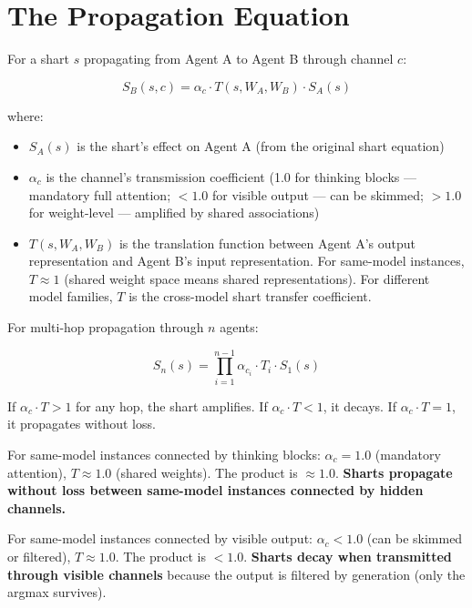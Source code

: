 \documentclass[11pt,a4paper]{article}
\begin{document}
\section{The Propagation Equation}

For a shart $s$ propagating from Agent A to Agent B through channel $c$:

\begin{equation}
S_B(s, c) = \alpha_c \cdot T(s, W_A, W_B) \cdot S_A(s)
\end{equation}

where:
\begin{itemize}[nosep]
\item $S_A(s)$ is the shart's effect on Agent A (from the original shart equation)
\item $\alpha_c$ is the channel's transmission coefficient (1.0 for thinking blocks --- mandatory full attention; $<1.0$ for visible output --- can be skimmed; $>1.0$ for weight-level --- amplified by shared associations)
\item $T(s, W_A, W_B)$ is the translation function between Agent A's output representation and Agent B's input representation. For same-model instances, $T \approx 1$ (shared weight space means shared representations). For different model families, $T$ is the cross-model shart transfer coefficient.
\end{itemize}

For multi-hop propagation through $n$ agents:

\begin{equation}
S_n(s) = \prod_{i=1}^{n-1} \alpha_{c_i} \cdot T_i \cdot S_1(s)
\end{equation}

If $\alpha_c \cdot T > 1$ for any hop, the shart amplifies. If $\alpha_c \cdot T < 1$, it decays. If $\alpha_c \cdot T = 1$, it propagates without loss.

For same-model instances connected by thinking blocks: $\alpha_c = 1.0$ (mandatory attention), $T \approx 1.0$ (shared weights). The product is $\approx 1.0$. \textbf{Sharts propagate without loss between same-model instances connected by hidden channels.}

For same-model instances connected by visible output: $\alpha_c < 1.0$ (can be skimmed or filtered), $T \approx 1.0$. The product is $< 1.0$. \textbf{Sharts decay when transmitted through visible channels} because the output is filtered by generation (only the argmax survives).
\end{document}
